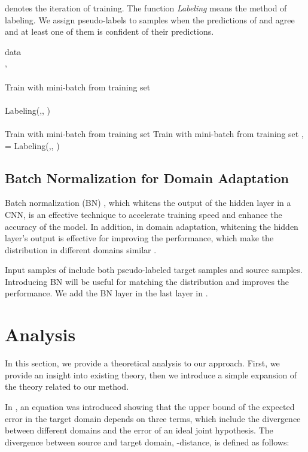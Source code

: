 \documentclass{article}
\begin{document}
\begin{algorithm}[t]
\begin{algorithmic}
 \caption{ denotes the iteration of training. The function \textit{Labeling} means the method of labeling. We assign pseudo-labels to samples when the predictions of  and  agree and at least one of them is confident of their predictions. \label{alg:whole}}
 data \\
, \\
\\
\STATE Train  with mini-batch from training set \\
\ENDFOR\\

\STATE   Labeling(,, )\\
\\
\STATE Train  with mini-batch from training set 
\STATE Train  with mini-batch from training set 
\ENDFOR
\STATE , 
\STATE  = Labeling(,, )
\STATE 
\ENDFOR
\end{algorithmic}
\end{algorithm}
\vspace{-3mm}
\subsection{Batch Normalization for Domain Adaptation}
Batch normalization (BN) \cite{ioffe2015batch}, which whitens the output of the hidden layer in a CNN, is an effective technique to accelerate training speed and enhance the accuracy of the model. In addition, in domain adaptation, whitening the hidden layer's output is effective for improving the performance, which make the distribution in different domains similar \cite{sun2015return,li2016revisiting}.

Input samples of  include both pseudo-labeled target samples and source samples. Introducing BN will be useful for matching the distribution and improves the performance. We add the BN layer in the last layer in .
\vspace{-3mm}
\section{Analysis}
In this section, we provide a theoretical analysis to our approach. First, we provide an insight into existing theory, then we introduce a simple expansion of the theory related to our method.

In \cite{ben2010theory}, an equation was introduced showing that the upper bound of the expected error in the target domain depends on three terms, which include the divergence between different domains and the error of an ideal joint hypothesis. 
The divergence between source and target domain, -distance, is defined as follows:
\end{document}
